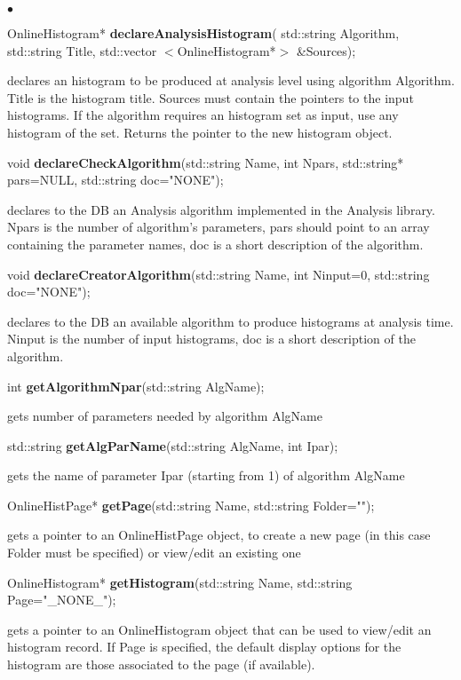 \documentclass{lhcbnote}
\begin{document}
\begin{list}{$\bullet$}{}
\item OnlineHistogram* {\bf declareAnalysisHistogram}( std::string 
Algorithm, std::string Title, std::vector $<$OnlineHistogram*$>$ \&Sources);

declares an histogram to be produced at analysis
level using algorithm Algorithm. Title is the histogram title. Sources
must contain the pointers to the input histograms. If the algorithm
requires an histogram set as input, use any histogram of the
set. Returns the pointer to the new histogram object.
 
\item   void {\bf declareCheckAlgorithm}(std::string Name, 
			     int Npars, 
			     std::string* pars=NULL, 
			     std::string doc="NONE");

declares to the DB an Analysis algorithm implemented in the Analysis
library. Npars is the number of algorithm's parameters, pars should
point to an array containing the parameter names, doc is a short
description of the algorithm.

\item  void {\bf declareCreatorAlgorithm}(std::string Name, 
			       int Ninput=0, 
			       std::string doc="NONE");

declares to the DB an available algorithm to produce histograms at
analysis time. Ninput is the number of input histograms, doc is a short
description of the algorithm.


\item  int {\bf getAlgorithmNpar}(std::string AlgName);

gets number of parameters needed by algorithm AlgName


\item std::string {\bf getAlgParName}(std::string AlgName,
		       int Ipar);

gets the name of parameter Ipar (starting from 1) of algorithm AlgName

\item  OnlineHistPage* {\bf getPage}(std::string Name, std::string Folder="");

gets a pointer to an OnlineHistPage object, to create a new page (in this case
Folder must be specified) or view/edit an existing one


\item  OnlineHistogram* {\bf getHistogram}(std::string Name,
				std::string Page="\_NONE\_");

gets a pointer to an OnlineHistogram object
that can be used to view/edit an histogram record. If Page
is specified, the default display options for the histogram are those
associated to the page (if available). 



\end{list}
\end{document}
